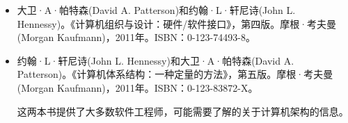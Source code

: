 \begin{itemize}
\item
大卫·A·帕特森(David A. Patterson)和约翰·L·轩尼诗(John L. Hennessy)。《计算机组织与设计：硬件/软件接口》，第四版。摩根·考夫曼(Morgan Kaufmann)，2011年。ISBN：0-123-74493-8。

\item
约翰·L·轩尼诗(John L. Hennessy)和大卫·A·帕特森(David A. Patterson)。《计算机体系结构：一种定量的方法》，第五版。摩根·考夫曼(Morgan Kaufmann)，2011年。ISBN：0-123-83872-X。

\hspace*{\fill}

这两本书提供了大多数软件工程师，可能需要了解的关于计算机架构的信息。
\end{itemize}

